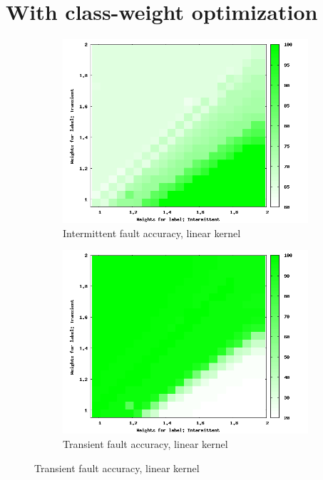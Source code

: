 \section{With class-weight optimization}

\begin{figure}
        \centering
			\captionsetup{justification=centering}
        \begin{subfigure}[h]{0.45\linewidth}
                \includegraphics[scale=0.25]{figures/lin256i.png}
                \caption{Intermittent fault accuracy, linear kernel}
        \end{subfigure}
        \begin{subfigure}[h]{0.45\linewidth}
                \includegraphics[scale=0.25]{figures/lin256t.png}
                \caption{Transient fault accuracy, linear kernel}
        \end{subfigure}


\end{figure}
